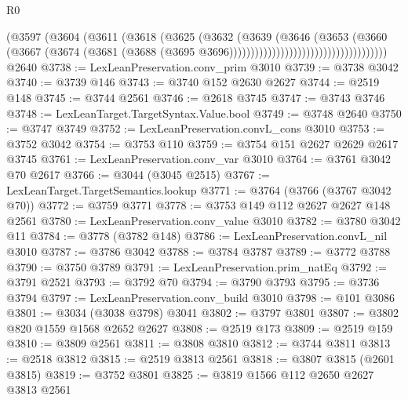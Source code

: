 \begin{lexlean}{R0}
\begin{coremodule}
                                                (@3597
                                                  (@3604
                                                    (@3611
                                                      (@3618
                                                        (@3625
                                                          (@3632
                                                            (@3639
                                                              (@3646
                                                                (@3653
                                                                  (@3660
                                                                    (@3667
                                                                      (@3674
                                                                        (@3681
                                                                          (@3688
                                                                            (@3695
                                                                              @3696)))))))))))))))))))))))))))))))))))))
    @2640
@3738 := LexLeanPreservation.conv_prim @3010
@3739 := @3738 @3042
@3740 := @3739 @146
@3743 := @3740 @152 @2630 @2627
@3744 := @2519 @148
@3745 := @3744 @2561
@3746 := @2618 @3745
@3747 := @3743 @3746
@3748 := LexLeanTarget.TargetSyntax.Value.bool
@3749 := @3748 @2640
@3750 := @3747 @3749
@3752 := LexLeanPreservation.convL_cons @3010
@3753 := @3752 @3042
@3754 := @3753 @110
@3759 := @3754 @151 @2627 @2629 @2617 @3745
@3761 := LexLeanPreservation.conv_var @3010
@3764 := @3761 @3042 @70 @2617
@3766 := @3044 (@3045 @2515)
@3767 := LexLeanTarget.TargetSemantics.lookup
@3771 := @3764 (@3766 (@3767 @3042 @70))
@3772 := @3759 @3771
@3778 := @3753 @149 @112 @2627 @2627 @148 @2561
@3780 := LexLeanPreservation.conv_value @3010
@3782 := @3780 @3042 @11
@3784 := @3778 (@3782 @148)
@3786 := LexLeanPreservation.convL_nil @3010
@3787 := @3786 @3042
@3788 := @3784 @3787
@3789 := @3772 @3788
@3790 := @3750 @3789
@3791 := LexLeanPreservation.prim_natEq
@3792 := @3791 @2521
@3793 := @3792 @70
@3794 := @3790 @3793
@3795 := @3736 @3794
@3797 := LexLeanPreservation.conv_build @3010
@3798 := @101 @3086
@3801 := @3034 (@3038 @3798) @3041
@3802 := @3797 @3801
@3807 := @3802 @820 @1559 @1568 @2652 @2627
@3808 := @2519 @173
@3809 := @2519 @159
@3810 := @3809 @2561
@3811 := @3808 @3810
@3812 := @3744 @3811
@3813 := @2518 @3812
@3815 := @2519 @3813 @2561
@3818 := @3807 @3815 (@2601 @3815)
@3819 := @3752 @3801
@3825 := @3819 @1566 @112 @2650 @2627 @3813 @2561

\end{coremodule}
\end{lexlean}
